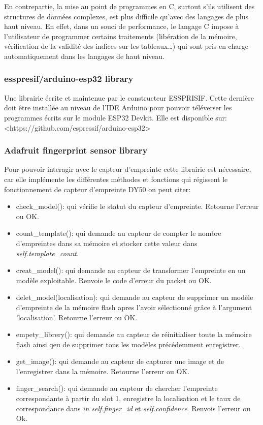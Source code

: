 En contrepartie, la mise au point de programmes en C, surtout s’ils utilisent 
des structures de données complexes, est plus difficile qu’avec des langages de 
plus haut niveau. En effet, dans un souci de performance, le langage C impose à 
l’utilisateur de programmer certains traitements (libération de la mémoire, 
vérification de la validité des indices sur les tableaux…) qui sont pris en 
charge automatiquement dans les langages de haut niveau\cite{35}.

\subsubsection{esspresif/arduino-esp32 library}
Une librairie écrite et maintenue par le constructeur ESSPRISIF. Cette dernière 
doit être installée au niveau de l'IDE Arduino pour pouvoir téléverser les 
programmes écrits sur le module ESP32 Devkit. Elle est disponible sur: 
<https://github.com/espressif/arduino-esp32>

\subsubsection{Adafruit fingerprint sensor library}
Pour pouvoir interagir avec le capteur d'empreinte cette librairie est 
nécessaire, car elle implémente les différentes méthodes et fonctions qui 
régissent le fonctionnement de capteur d'empreinte DY50 on peut citer:

\begin{itemize}
    \item[\textbullet] check\_model(): qui vérifie le statut du capteur
        d'empreinte. Retourne l'erreur ou OK.
    \item[\textbullet] count\_template(): qui demande au capteur de compter le
        nombre d'empreintes dans sa mémoire et stocker cette valeur dans
        \emph{self.template\_count}.
    \item[\textbullet] creat\_model(): qui demande au capteur de transformer
        l'empreinte en un modèle exploitable. Renvoie le code d'erreur du packet
        ou OK.
    \item[\textbullet] delet\_model(localisation): qui demande au capteur de
        supprimer un modèle d'empreinte de la mémoire flash apres l'avoir
        sélectionné grâce à l'argument 'localisation'. Retourne l'erreur ou OK.
    \item[\textbullet] empety\_librery(): qui demande au capteur de
        réinitialiser toute la mémoire flash ainsi qeu de supprimer tous les
        modèles précédemment enregistrer. 
    \item[\textbullet] get\_image(): qui demande au capteur de capturer une
        image et de l'enregistrer dans la mémoire. Retourne l'erreur ou OK. 
    \item[\textbullet] finger\_search(): qui demande au capteur de chercher
        l'empreinte correspondante à partir du slot 1, enregistre la
        localisation et le taux de correspondance dans \emph{in self.finger\_id}
        et \emph{self.confidence}. Renvois l'erreur ou Ok.\cite{36}
\end{itemize}

